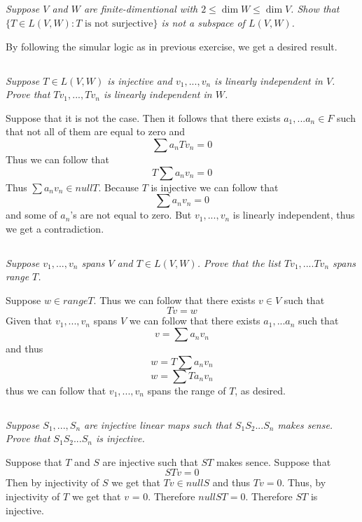 \documentclass[11pt,oneside,titlepage]{book}
\begin{document}
\subsection{}

\textit{Suppose $V$ and $W$ are finite-dimentional with $2 \leq \dim W \leq \dim V$.
  Show that $\{T \in L(V, W): T \text{ is not surjective}\}$ is not a subspace of $L(V, W)$.}

By following the simular logic as in previous exercise, we get a desired result.

\subsection{}

\textit{Suppose $T \in L(V, W)$ is injective and $v_1, ..., v_n$ is linearly independent
  in $V$. Prove that $Tv_1, ..., Tv_n$ is linearly independent in $W$.}

Suppose that it is not the case. Then it follows that there exists $a_1, ... a_n \in F$ such
that not all of them are equal to zero and 
$$\sum a_n T v_n = 0$$
Thus we can follow that
$$T \sum a_n v_n = 0$$
Thus $\sum a_n v_n \in null T$. Because $T$ is injective we can follow that
$$\sum a_n v_n = 0$$
and some of $a_n$'s are not equal to zero. But $v_1, ..., v_n$ is linearly independent, thus
we get a contradiction.

\subsection{}

\textit{Suppose $v_1, ..., v_n$ spans $V$ and $T \in L(V, W)$. Prove that the list
  $T v_1, .... Tv_n$ spans range $T$.}

Suppose $w \in range T$. Thus we can follow that there exists $v \in V$ such that
$$Tv = w$$
Given that $v_1, ..., v_n$ spans $V$ we can follow that there exists $a_1, ... a_n$ such that
$$v = \sum a_n v_n$$
and thus
$$w = T \sum a_n v_n$$
$$w =  \sum T a_n v_n$$
thus we can follow that $v_1, ..., v_n$ spans the range of $T$, as desired.

\subsection{}
\textit{Suppose $S_1, ..., S_n$ are injective linear maps such that $S_1 S_2 ... S_n$ makes sense.
  Prove that $S_1 S_2 ... S_n$ is injective. }

Suppose that $T$ and $S$ are injective such that $ST$ makes sence. Suppose that
$$STv = 0$$
Then by injectivity of $S$ we get that $Tv \in null S$ and thus $Tv = 0$. Thus, by injectivity of
$T$ we get that $v$ = 0. Therefore $null ST = 0$. Therefore $ST$ is injective.
\end{document}

